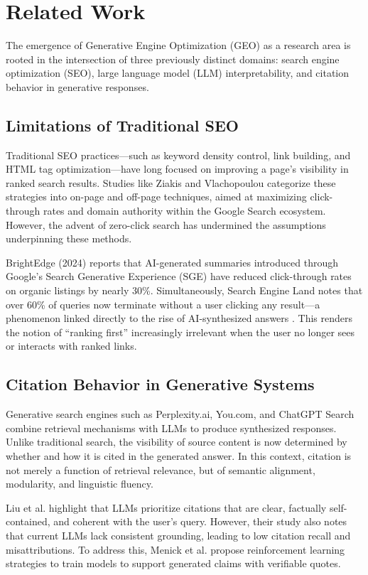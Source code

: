 \section{Related Work}

The emergence of Generative Engine Optimization (GEO) as a research area is rooted in the intersection of three previously distinct domains: search engine optimization (SEO), large language model (LLM) interpretability, and citation behavior in generative responses.

\subsection{Limitations of Traditional SEO}

Traditional SEO practices—such as keyword density control, link building, and HTML tag optimization—have long focused on improving a page’s visibility in ranked search results. Studies like Ziakis and Vlachopoulou \cite{ziakis2024ai} categorize these strategies into on-page and off-page techniques, aimed at maximizing click-through rates and domain authority within the Google Search ecosystem. However, the advent of zero-click search has undermined the assumptions underpinning these methods.

BrightEdge (2024) reports that AI-generated summaries introduced through Google’s Search Generative Experience (SGE) have reduced click-through rates on organic listings by nearly 30\%. Simultaneously, Search Engine Land notes that over 60\% of queries now terminate without a user clicking any result—a phenomenon linked directly to the rise of AI-synthesized answers \cite{lodolce2024gartner}. This renders the notion of “ranking first” increasingly irrelevant when the user no longer sees or interacts with ranked links.

\subsection{Citation Behavior in Generative Systems}

Generative search engines such as Perplexity.ai, You.com, and ChatGPT Search combine retrieval mechanisms with LLMs to produce synthesized responses. Unlike traditional search, the visibility of source content is now determined by whether and how it is cited in the generated answer. In this context, citation is not merely a function of retrieval relevance, but of semantic alignment, modularity, and linguistic fluency.

Liu et al. \cite{liu2023verifiability} highlight that LLMs prioritize citations that are clear, factually self-contained, and coherent with the user’s query. However, their study also notes that current LLMs lack consistent grounding, leading to low citation recall and misattributions. To address this, Menick et al. \cite{menick2022quotes} propose reinforcement learning strategies to train models to support generated claims with verifiable quotes.

